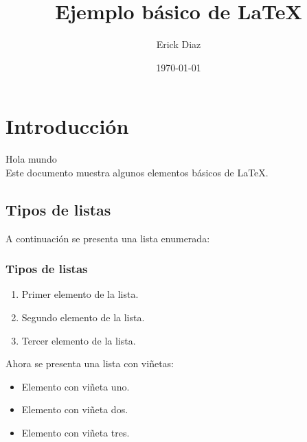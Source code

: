 \documentclass{article}
\title{Ejemplo básico de LaTeX}
\author{Erick Diaz}
\date{\today}
\newcommand{\saludo}{Hola mundo \\}
\begin{document}
\maketitle

\section{Introducción}
\saludo
Este documento muestra algunos 
elementos básicos de \LaTeX.

\subsection{Tipos de listas}
A continuación se presenta 
una lista enumerada:

\subsubsection{Tipos de listas}

\begin{enumerate}
  \item Primer elemento de la lista.
  \item Segundo elemento de la lista.
  \item Tercer elemento de la lista.
\end{enumerate}

Ahora se presenta una lista con viñetas:

\begin{itemize}
  \item Elemento con viñeta uno.
  \item Elemento con viñeta dos.
  \item Elemento con viñeta tres.
\end{itemize}
\end{document}
